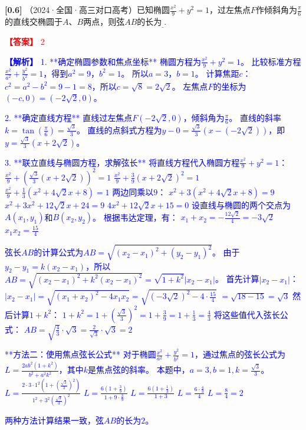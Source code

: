 \documentclass[varwidth=16cm, border=2mm]{standalone}
\begin{document}
\textbf{[0.6]} （2024·全国·高三对口高考）已知椭圆$\frac{x^2}{9} + y^2 = 1$，过左焦点$F$作倾斜角为$\frac{\pi}{6}$的直线交椭圆于$A$、$B$两点，则弦$AB$的长为$_{\_}$.

\vspace{0.2cm}\par\noindent\textcolor{red}{\textbf{【答案】} 2}
\par\noindent\textcolor{blue}{\textbf{【解析】} 1. **确定椭圆参数和焦点坐标**
   椭圆方程为$\frac{x^2}{9} + y^2 = 1$。
   比较标准方程$\frac{x^2}{a^2} + \frac{y^2}{b^2} = 1$，得到$a^2 = 9$，$b^2 = 1$。
   所以$a = 3$，$b = 1$。
   计算焦距$c$：$c^2 = a^2 - b^2 = 9 - 1 = 8$，所以$c = \sqrt{8} = 2\sqrt{2}$。
   左焦点$F$的坐标为$(-c, 0) = (-2\sqrt{2}, 0)$。

2. **确定直线方程**
   直线过左焦点$F(-2\sqrt{2}, 0)$，倾斜角为$\frac{\pi}{6}$。
   直线的斜率$k = \tan(\frac{\pi}{6}) = \frac{\sqrt{3}}{3}$。
   直线的点斜式方程为$y - 0 = \frac{\sqrt{3}}{3}(x - (-2\sqrt{2}))$，即$y = \frac{\sqrt{3}}{3}(x + 2\sqrt{2})$。

3. **联立直线与椭圆方程，求解弦长**
   将直线方程代入椭圆方程$\frac{x^2}{9} + y^2 = 1$：
   $\frac{x^2}{9} + \left(\frac{\sqrt{3}}{3}(x + 2\sqrt{2})\right)^2 = 1$
   $\frac{x^2}{9} + \frac{3}{9}(x + 2\sqrt{2})^2 = 1$
   $\frac{x^2}{9} + \frac{1}{3}(x^2 + 4\sqrt{2}x + 8) = 1$
   两边同乘以$9$：
   $x^2 + 3(x^2 + 4\sqrt{2}x + 8) = 9$
   $x^2 + 3x^2 + 12\sqrt{2}x + 24 = 9$
   $4x^2 + 12\sqrt{2}x + 15 = 0$
   设直线与椭圆的两个交点为$A(x_1, y_1)$和$B(x_2, y_2)$。
   根据韦达定理，有：
   $x_1 + x_2 = -\frac{12\sqrt{2}}{4} = -3\sqrt{2}$
   $x_1 x_2 = \frac{15}{4}$

   弦长$AB$的计算公式为$AB = \sqrt{(x_2 - x_1)^2 + (y_2 - y_1)^2}$。
   由于$y_2 - y_1 = k(x_2 - x_1)$，所以$AB = \sqrt{(x_2 - x_1)^2 + k^2(x_2 - x_1)^2} = \sqrt{1+k^2}|x_2 - x_1|$。
   首先计算$|x_2 - x_1|$：
   $|x_2 - x_1| = \sqrt{(x_1 + x_2)^2 - 4x_1 x_2} = \sqrt{(-3\sqrt{2})^2 - 4 \cdot \frac{15}{4}}$
   $= \sqrt{18 - 15} = \sqrt{3}$
   然后计算$1+k^2$：
   $1+k^2 = 1 + \left(\frac{\sqrt{3}}{3}\right)^2 = 1 + \frac{3}{9} = 1 + \frac{1}{3} = \frac{4}{3}$
   将这些值代入弦长公式：
   $AB = \sqrt{\frac{4}{3}} \cdot \sqrt{3} = \frac{2}{\sqrt{3}} \cdot \sqrt{3} = 2$

   **方法二：使用焦点弦长公式**
   对于椭圆$\frac{x^2}{a^2} + \frac{y^2}{b^2} = 1$，通过焦点的弦长公式为$L = \frac{2ab^2(1+k^2)}{b^2 + a^2k^2}$，其中$k$是焦点弦的斜率。
   本题中，$a=3, b=1, k=\frac{\sqrt{3}}{3}$。
   $L = \frac{2 \cdot 3 \cdot 1^2 \left(1+\left(\frac{\sqrt{3}}{3}\right)^2\right)}{1^2 + 3^2 \left(\frac{\sqrt{3}}{3}\right)^2}$
   $L = \frac{6 \left(1+\frac{3}{9}\right)}{1 + 9 \cdot \frac{3}{9}}$
   $L = \frac{6 \left(1+\frac{1}{3}\right)}{1+3}$
   $L = \frac{6 \cdot \frac{4}{3}}{4}$
   $L = \frac{8}{4} = 2$

   两种方法计算结果一致，弦$AB$的长为$2$。}
\end{document}
